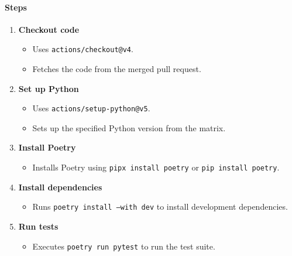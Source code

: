 \paragraph{Steps}
\begin{enumerate}
    \item \textbf{Checkout code}
    \begin{itemize}
        \item Uses \texttt{actions/checkout@v4}.
        \item Fetches the code from the merged pull request.
    \end{itemize}
    \item \textbf{Set up Python}
    \begin{itemize}
        \item Uses \texttt{actions/setup-python@v5}.
        \item Sets up the specified Python version from the matrix.
    \end{itemize}
    \item \textbf{Install Poetry}
    \begin{itemize}
        \item Installs Poetry using \texttt{pipx install poetry} or \texttt{pip install poetry}.
    \end{itemize}
    \item \textbf{Install dependencies}
    \begin{itemize}
        \item Runs \texttt{poetry install --with dev} to install development dependencies.
    \end{itemize}
    \item \textbf{Run tests}
    \begin{itemize}
        \item Executes \texttt{poetry run pytest} to run the test suite.
    \end{itemize}
\end{enumerate}


